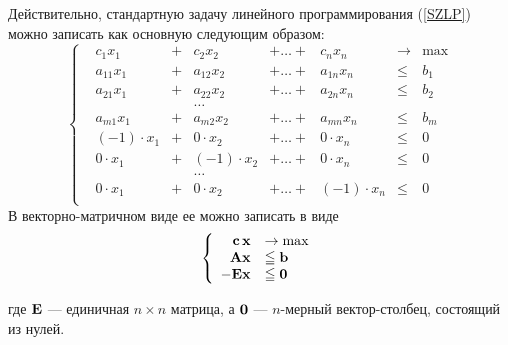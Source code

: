     Действительно, стандартную задачу линейного
    программирования (\ref{SZLP}) можно записать как основную следующим образом:
\begin{equation}\label{SZLPSV}
\left\{
\begin{array}{rrrrrrlc}
            & c_1 x_1     & + & c_2 x_2       &+ \ldots + & c_n x_n    &\to  & \max\\
            & a_{11} x_1  & + & a_{12} x_2    &+ \ldots + & a_{1n} x_n &\leqslant & b_1 \\
            & a_{21} x_1  & + & a_{22} x_2    &+ \ldots + & a_{2n} x_n &\leqslant & b_2\\
            &             &   &  \ldots \\
            & a_{m1} x_1  & + & a_{m2} x_2    &+ \ldots + & a_{mn} x_n &\leqslant& b_m\\
            &(-1)\cdot x_1& + & 0\cdot x_2    &+ \ldots + & 0\cdot x_n &\leqslant& 0 \\
            & 0 \cdot x_1 & + & (-1)\cdot x_2 &+ \ldots + & 0\cdot x_n &\leqslant& 0 \\
            &             &   &  \ldots \\
            & 0 \cdot x_1 & + & 0\cdot x_2    &+ \ldots + &(-1)\cdot x_n &\leqslant& 0 \\
\end{array} \right.
\end{equation}
    В векторно-матричном виде ее можно записать в виде
\begin{equation}\label{SZLPVSV}
\left\{
\begin{array}{rl}
 \mathbf{c} \, \mathbf{x} & \to \max  \\
 \mathbf{A} \mathbf{x} &\leqq \mathbf{b} \\
 \mathbf{-E} \mathbf{x}&\leqq \mathbf{0}
\end{array} \right.
\end{equation}

\noindent где $\mathbf{E}$ --- единичная $n\times n$ матрица, а $\mathbf{0}$
--- $n$-мерный вектор-столбец, состоящий из нулей.





